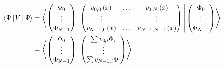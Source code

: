 \begin{equation}
\begin{split}
  \Braket{\Psi | V | \Psi}
      & = \Braket{ \begin{pmatrix} \Phi_0 \\ \vdots \\ \Phi_{N-1} \end{pmatrix}
                 | \begin{pmatrix}
                     v_{0,0} \left( x \right)   & \hdots & v_{0,N} \left( x \right) \\
                     \vdots            & {}     & \vdots \\
                     v_{N-1,0} \left( x \right) & \hdots & v_{N-1,N-1} \left( x \right) \\
                   \end{pmatrix}
                 | \begin{pmatrix} \Phi_0 \\ \vdots \\ \Phi_{N-1} \end{pmatrix}
                 } \\
      & = \Braket{ \begin{pmatrix} \Phi_0 \\ \vdots \\ \Phi_{N-1} \end{pmatrix}
                 | \begin{pmatrix} \sum v_{0,i} \Phi_i \\ \vdots \\ \sum v_{N-1,i} \Phi_i \end{pmatrix}
                 }
\end{split}
\end{equation}


